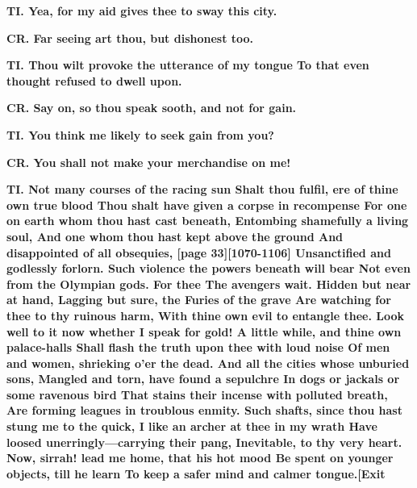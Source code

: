 \documentclass[11pt,letter]{book}
\begin{document}
\par \textbf{TI. Yea, for my aid gives thee to sway this city.}
\par 

\par \textbf{CR. Far seeing art thou, but dishonest too.}
\par 

\par \textbf{TI. Thou wilt provoke the utterance of my tongue To that even thought refused to dwell upon.}
\par 

\par \textbf{CR. Say on, so thou speak sooth, and not for gain.}
\par 

\par \textbf{TI. You think me likely to seek gain from you?}
\par 

\par \textbf{CR. You shall not make your merchandise on me!}
\par 

\par \textbf{TI. Not many courses of the racing sun Shalt thou fulfil, ere of thine own true blood Thou shalt have given a corpse in recompense For one on earth whom thou hast cast beneath, Entombing shamefully a living soul, And one whom thou hast kept above the ground And disappointed of all obsequies, [page 33][1070-1106] Unsanctified and godlessly forlorn. Such violence the powers beneath will bear Not even from the Olympian gods. For thee The avengers wait. Hidden but near at hand, Lagging but sure, the Furies of the grave Are watching for thee to thy ruinous harm, With thine own evil to entangle thee. Look well to it now whether I speak for gold! A little while, and thine own palace-halls Shall flash the truth upon thee with loud noise Of men and women, shrieking o’er the dead. And all the cities whose unburied sons, Mangled and torn, have found a sepulchre In dogs or jackals or some ravenous bird That stains their incense with polluted breath, Are forming leagues in troublous enmity. Such shafts, since thou hast stung me to the quick, I like an archer at thee in my wrath Have loosed unerringly—carrying their pang, Inevitable, to thy very heart. Now, sirrah! lead me home, that his hot mood Be spent on younger objects, till he learn To keep a safer mind and calmer tongue.[Exit}
\par 
\end{document}
